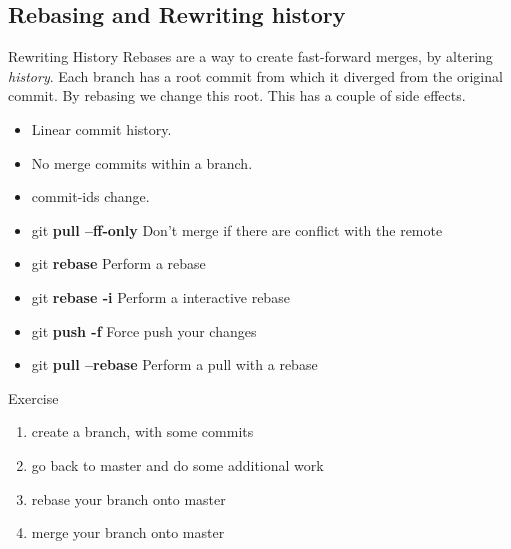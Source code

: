 \documentclass{beamer}
\begin{document}
\subsection{Rebasing and Rewriting history}
\begin{frame}[fragile]{Rewriting History}
  Rebases are a way to create fast-forward merges, by altering \emph{history}. Each branch has a root commit from which it diverged from the original commit. By rebasing we change this root. This has a couple of side effects. 
  \begin{itemize}
    \item Linear commit history.
    \item No merge commits within a branch.
    \item commit-ids change.
  \end{itemize}

  \begin{block}{}
    \begin{itemize}
      \item git \textbf{pull --ff-only} Don't merge if there are conflict with the remote
      \item git \textbf{rebase} Perform a rebase
      \item git \textbf{rebase -i} Perform a interactive rebase
      \item git \textbf{push -f} Force push your changes
      \item git \textbf{pull --rebase} Perform a pull with a rebase
    \end{itemize}
  \end{block}
\end{frame}
\begin{frame}
  \begin{block}{Exercise}
    \begin{enumerate}
      \item create a branch, with some commits
      \item go back to master and do some additional work
      \item rebase your branch onto master
      \item merge your branch onto master
    \end{enumerate}
  \end{block}
\end{frame}
\end{document}
